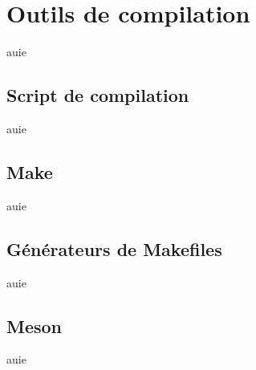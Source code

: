 
\section{Outils de compilation}
\begin{frame} auie \end{frame}
\subsection{Script de compilation}
\begin{frame} auie \end{frame}
\subsection{Make}
\begin{frame} auie \end{frame}
\subsection{Générateurs de Makefiles}
\begin{frame} auie \end{frame}
\subsection{Meson}
\begin{frame} auie \end{frame}
